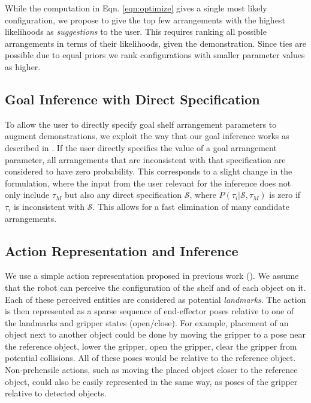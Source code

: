
While the computation in Eqn. \ref{eqn:optimize} gives a single most likely configuration, we propose to give the top few arrangements with the highest likelihoods as {\em suggestions} to the user.
This requires ranking all possible arrangements in terms of their likelihoods, given the demonstration.
Since ties are possible due to equal priors we rank configurations with smaller parameter values as higher.

\subsection{Goal Inference with Direct Specification}
\label{sec:irosspecification}

To allow the user to directly specify goal shelf arrangement parameters to augment demonstrations, we exploit the way that our goal inference works as described in .
If the user directly specifies the value of a goal arrangement parameter, all arrangements that are inconsistent with that specification are considered to have zero probability. 
This corresponds to a slight change in the formulation, where the input from the user relevant for the inference does not only include $\tau_M$ but also any direct specification $\mathcal{S}$, where $P(\tau_i | \mathcal{S}, \tau_M)$ is zero if $\tau_i$ is inconsistent with $\mathcal{S}$.
This allows for a fast elimination of many candidate arrangements.


\subsection{Action Representation and Inference}
\label{sec:irosactions}

We use a simple action representation proposed in previous work (\cite{akgun2012keyframe,alexandrova2014robot}).
We assume that the robot can perceive the configuration of the shelf and of each object on it.
Each of these perceived entities are considered as potential {\em landmarks}.
The action is then represented as a sparse sequence of end-effector poses relative to one of the landmarks and gripper states (open/close).
For example, placement of an object next to another object could be done by moving the gripper to a pose near the reference object, lower the gripper, open the gripper, clear the gripper from potential collisions. All of these poses would be relative to the reference object. Non-prehensile actions, such as moving the placed object closer to the reference object, could also be easily represented in the same way, as poses of the gripper relative to detected objects.

